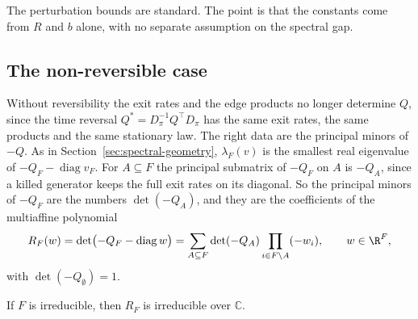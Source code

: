 The perturbation bounds are standard. The point is that the constants come from
$R$ and $b$ alone, with no separate assumption on the spectral gap.

\subsection{The non-reversible case}\label{sec:nonreversible-reconstruction}

Without reversibility the exit rates and the edge products no longer
determine $Q$, since the time reversal $Q^*=D_\pi^{-1}Q^\top D_\pi$ has the same
exit rates, the same products and the same stationary law. The right data are
the principal minors of $-Q$. As in Section~\ref{sec:spectral-geometry},
$\lambda_F(v)$ is the smallest real eigenvalue of $-Q_F-\operatorname{diag}v_F$.
For $A\subseteq F$ the principal submatrix of $-Q_F$ on $A$ is $-Q_A$, since a
killed generator keeps the full exit rates on its diagonal. So the principal
minors of $-Q_F$ are the numbers $\det(-Q_A)$, and they are the coefficients of
the multiaffine polynomial
\[
 R_F(w)=\det\bigl(-Q_F-\operatorname{diag}w\bigr)
 =\sum_{A\subseteq F}\det(-Q_A)\prod_{i\in F\setminus A}(-w_i),\qquad w\in\R^F,
\]
with $\det(-Q_\emptyset)=1$.

\begin{lemma}[irreducibility]\label{lem:RF-irreducible}
If $F$ is irreducible, then $R_F$ is irreducible over $\mathbb C$.
\end{lemma}

